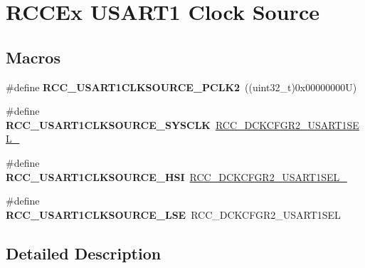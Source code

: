 \hypertarget{group___r_c_c_ex___u_s_a_r_t1___clock___source}{}\section{R\+C\+C\+Ex U\+S\+A\+R\+T1 Clock Source}
\label{group___r_c_c_ex___u_s_a_r_t1___clock___source}
\subsection*{Macros}
\begin{DoxyCompactItemize}
\item 
\mbox{\label{group___r_c_c_ex___u_s_a_r_t1___clock___source_ga0b28509687786167271f0eb84b80b124}} 
\#define {\bfseries R\+C\+C\+\_\+\+U\+S\+A\+R\+T1\+C\+L\+K\+S\+O\+U\+R\+C\+E\+\_\+\+P\+C\+L\+K2}~((uint32\+\_\+t)0x00000000\+U)
\item 
\mbox{\label{group___r_c_c_ex___u_s_a_r_t1___clock___source_ga50441be9ccc8a7abbdba23cfd7f7286c}} 
\#define {\bfseries R\+C\+C\+\_\+\+U\+S\+A\+R\+T1\+C\+L\+K\+S\+O\+U\+R\+C\+E\+\_\+\+S\+Y\+S\+C\+LK}~\mbox{\hyperlink{group___peripheral___registers___bits___definition_gae39e767cd8969e80d03a8bde9b3f5674}{R\+C\+C\+\_\+\+D\+C\+K\+C\+F\+G\+R2\+\_\+\+U\+S\+A\+R\+T1\+S\+E\+L\+\_}}
\item 
\mbox{\label{group___r_c_c_ex___u_s_a_r_t1___clock___source_ga15818f4637d9721117cf6751ad79af28}} 
\#define {\bfseries R\+C\+C\+\_\+\+U\+S\+A\+R\+T1\+C\+L\+K\+S\+O\+U\+R\+C\+E\+\_\+\+H\+SI}~\mbox{\hyperlink{group___peripheral___registers___bits___definition_gabdd7fec2787e17d8ab0a7825ed13961d}{R\+C\+C\+\_\+\+D\+C\+K\+C\+F\+G\+R2\+\_\+\+U\+S\+A\+R\+T1\+S\+E\+L\+\_}}
\item 
\mbox{\label{group___r_c_c_ex___u_s_a_r_t1___clock___source_gac2e82299a4295d0e5bf42950f99ddb39}} 
\#define {\bfseries R\+C\+C\+\_\+\+U\+S\+A\+R\+T1\+C\+L\+K\+S\+O\+U\+R\+C\+E\+\_\+\+L\+SE}~R\+C\+C\+\_\+\+D\+C\+K\+C\+F\+G\+R2\+\_\+\+U\+S\+A\+R\+T1\+S\+EL
\end{DoxyCompactItemize}


\subsection{Detailed Description}
